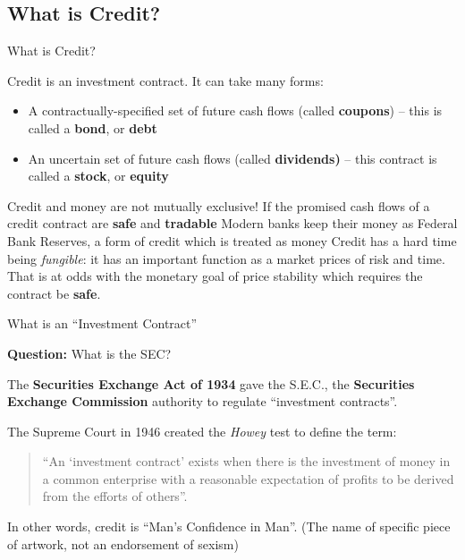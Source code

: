 \documentclass[aspectratio=169]{beamer}
\begin{document}
\subsection{What is Credit?}

\begin{frame}{What is Credit?}

Credit is an investment contract. It can take many forms: 
\begin{itemize}
    \item A contractually-specified set of future cash flows (called \textbf{coupons}) -- this is called a \textbf{bond}, or \textbf{debt}
    \item An uncertain set of future cash flows (called \textbf{dividends)} -- this contract is called a \textbf{stock}, or \textbf{equity} \pause

    
\end{itemize}
Credit and money are not mutually exclusive! \pause If the promised cash flows of a credit contract are \textbf{safe} and \textbf{tradable}
\bi 
    \m Modern banks keep their money as Federal Bank Reserves, a form of credit which is treated as money 
    \m Credit has a hard time being \emph{fungible}: it has an important function as a market prices of risk and time. That is at odds with the monetary goal of price stability which requires the contract be \textbf{safe}. 
\ei 
    
\end{frame}

\begin{frame}{What is an ``Investment Contract''}


\textbf{Question:} What is the SEC? 

\pause 

The \textbf{Securities Exchange Act of 1934} gave the S.E.C., the \textbf{Securities Exchange Commission} authority to regulate ``investment contracts''. 
\vfill 

\noindent The Supreme Court in 1946 created the \emph{Howey} test to define the term: 

\begin{quote}
    ``An `investment contract' exists when there is the investment of money in a common enterprise with a reasonable expectation of profits to be derived from the efforts of others''.
\end{quote}
\pause \vfill 

In other words, credit is ``Man's Confidence in Man''. (The name of specific piece of artwork, not an endorsement of sexism)  

\end{frame}
\end{document}

